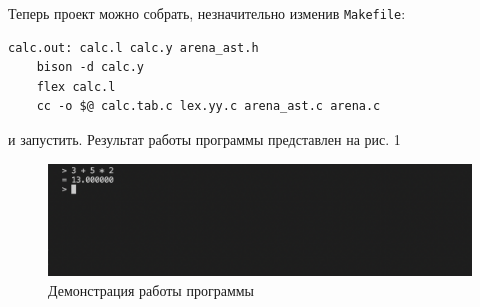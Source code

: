 Теперь проект можно собрать, незначительно изменив \verb|Makefile|:

\begin{verbatim}
calc.out: calc.l calc.y arena_ast.h 
    bison -d calc.y 
    flex calc.l 
    cc -o $@ calc.tab.c lex.yy.c arena_ast.c arena.c
\end{verbatim}
и запустить. Результат работы программы представлен на рис. 1

\begin{figure}[hbt!]
    \centering
    \includegraphics[scale=0.5]{naivetest.png}
    \caption{Демонстрация работы программы}
    \label{fig:naivetest}
\end{figure}